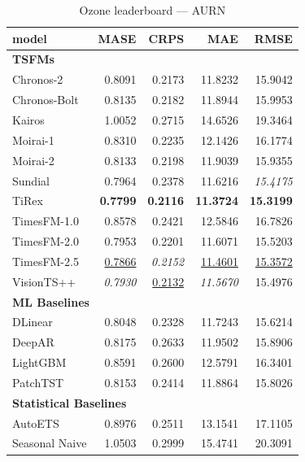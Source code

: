\begin{table}[H]
\caption{Ozone leaderboard --- AURN}
\centering
\begin{small}
\begin{tabular}{lrrrr}
\toprule
model & MASE & CRPS & MAE & RMSE \\
\midrule
\multicolumn{5}{l}{\textbf{TSFMs}} \\
Chronos-2 & 0.8091 & 0.2173 & 11.8232 & 15.9042 \\
Chronos-Bolt & 0.8135 & 0.2182 & 11.8944 & 15.9953 \\
Kairos & 1.0052 & 0.2715 & 14.6526 & 19.3464 \\
Moirai-1 & 0.8310 & 0.2235 & 12.1426 & 16.1774 \\
Moirai-2 & 0.8133 & 0.2198 & 11.9039 & 15.9355 \\
Sundial & 0.7964 & 0.2378 & 11.6216 & \textit{15.4175} \\
TiRex & \textbf{0.7799} & \textbf{0.2116} & \textbf{11.3724} & \textbf{15.3199} \\
TimesFM-1.0 & 0.8578 & 0.2421 & 12.5846 & 16.7826 \\
TimesFM-2.0 & 0.7953 & 0.2201 & 11.6071 & 15.5203 \\
TimesFM-2.5 & \underline{0.7866} & \textit{0.2152} & \underline{11.4601} & \underline{15.3572} \\
VisionTS++ & \textit{0.7930} & \underline{0.2132} & \textit{11.5670} & 15.4976 \\
\midrule
\multicolumn{5}{l}{\textbf{ML Baselines}} \\
DLinear & 0.8048 & 0.2328 & 11.7243 & 15.6214 \\
DeepAR & 0.8175 & 0.2633 & 11.9502 & 15.8906 \\
LightGBM & 0.8591 & 0.2600 & 12.5791 & 16.3401 \\
PatchTST & 0.8153 & 0.2414 & 11.8864 & 15.8026 \\
\midrule
\multicolumn{5}{l}{\textbf{Statistical Baselines}} \\
AutoETS & 0.8976 & 0.2511 & 13.1541 & 17.1105 \\
Seasonal Naive & 1.0503 & 0.2999 & 15.4741 & 20.3091 \\
\bottomrule
\end{tabular}
\end{small}
\end{table}